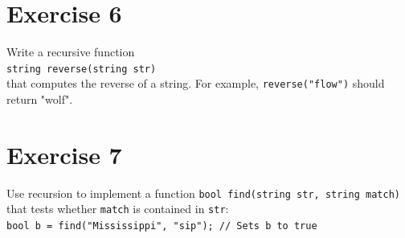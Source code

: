 \documentclass[10pt,a4paper]{article}
\begin{document}
	\section*{Exercise 6}
	Write a recursive function\\
	\verb|string reverse(string str)|\\
	that computes the reverse of a string. For example, \verb|reverse("flow")| should return
	"wolf".
	
	\section*{Exercise 7}
	Use recursion to implement a function \verb|bool find(string str, string match)| that tests whether \verb|match| is contained in \verb|str|:\\
	\verb|bool b = find("Mississippi", "sip"); // Sets b to true|
\end{document}
